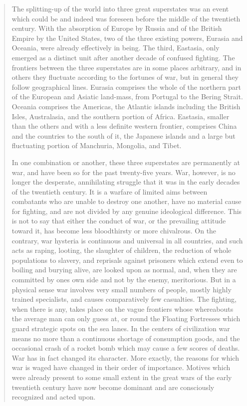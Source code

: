 \begin{quotation}
The splitting-up of the world into three great superstates was an event
which could be and indeed was foreseen before the middle of the
twentieth century. With the absorption of Europe by Russia and of the
British Empire by the United States, two of the three existing powers,
Eurasia and Oceania, were already effectively in being. The third,
Eastasia, only emerged as a distinct unit after another decade of
confused fighting. The frontiers between the three superstates are in
some places arbitrary, and in others they fluctuate according to the
fortunes of war, but in general they follow geographical lines. Eurasia
comprises the whole of the northern part of the European and Asiatic
land-mass, from Portugal to the Bering Strait. Oceania comprises the
Americas, the Atlantic islands including the British Isles, Australasia,
and the southern portion of Africa. Eastasia, smaller than the others
and with a less definite western frontier, comprises China and the
countries to the south of it, the Japanese islands and a large but
fluctuating portion of Manchuria, Mongolia, and Tibet.

In one combination or another, these three superstates are permanently
at war, and have been so for the past twenty-five years. War, however,
is no longer the desperate, annihilating struggle that it was in the
early decades of the twentieth century. It is a warfare of limited aims
between combatants who are unable to destroy one another, have no
material cause for fighting, and are not divided by any genuine
ideological difference. This is not to say that either the conduct of
war, or the prevailing attitude toward it, has become less bloodthirsty
or more chivalrous. On the contrary, war hysteria is continuous and
universal in all countries, and such acts as raping, looting, the
slaughter of children, the reduction of whole populations to slavery,
and reprisals against prisoners which extend even to boiling and burying
alive, are looked upon as normal, and, when they are committed by
one\textquotesingle s own side and not by the enemy, meritorious. But in
a physical sense war involves very small numbers of people, mostly
highly trained specialists, and causes comparatively few casualties. The
fighting, when there is any, takes place on the vague frontiers whose
whereabouts the average man can only guess at, or round the Floating
Fortresses which guard strategic spots on the sea lanes. In the centers
of civilization war means no more than a continuous shortage of
consumption goods, and the occasional crash of a rocket bomb which may
cause a few scores of deaths. War has in fact changed its character.
More exactly, the reasons for which war is waged have changed in their
order of importance. Motives which were already present to some small
extent in the great wars of the early twentieth century have now become
dominant and are consciously recognized and acted upon.


\end{quotation}
